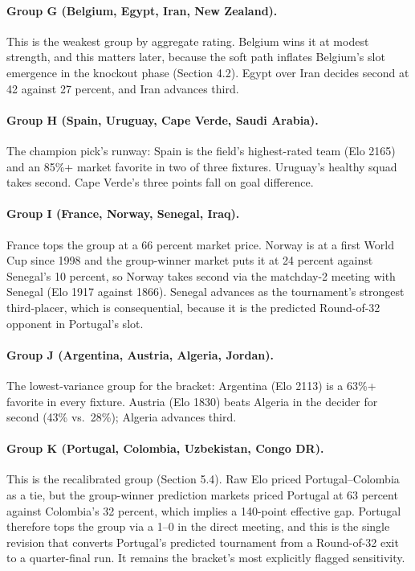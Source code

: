 \documentclass[11pt,a4paper]{article}
\begin{document}
\paragraph{Group G (Belgium, Egypt, Iran, New Zealand).} This is the weakest group by aggregate rating. Belgium wins it at modest strength, and this matters later, because the soft path inflates Belgium's slot emergence in the knockout phase (Section 4.2). Egypt over Iran decides second at 42 against 27 percent, and Iran advances third.

\paragraph{Group H (Spain, Uruguay, Cape Verde, Saudi Arabia).} The champion pick's runway: Spain is the field's highest-rated team (Elo 2165) and an 85\%+ market favorite in two of three fixtures. Uruguay's healthy squad takes second. Cape Verde's three points fall on goal difference.

\paragraph{Group I (France, Norway, Senegal, Iraq).} France tops the group at a 66 percent market price. Norway is at a first World Cup since 1998 and the group-winner market puts it at 24 percent against Senegal's 10 percent, so Norway takes second via the matchday-2 meeting with Senegal (Elo 1917 against 1866). Senegal advances as the tournament's strongest third-placer, which is consequential, because it is the predicted Round-of-32 opponent in Portugal's slot.

\paragraph{Group J (Argentina, Austria, Algeria, Jordan).} The lowest-variance group for the bracket: Argentina (Elo 2113) is a 63\%+ favorite in every fixture. Austria (Elo 1830) beats Algeria in the decider for second (43\% vs.\ 28\%); Algeria advances third.

\paragraph{Group K (Portugal, Colombia, Uzbekistan, Congo DR).} This is the recalibrated group (Section 5.4). Raw Elo priced Portugal--Colombia as a tie, but the group-winner prediction markets priced Portugal at 63 percent against Colombia's 32 percent, which implies a 140-point effective gap. Portugal therefore tops the group via a 1--0 in the direct meeting, and this is the single revision that converts Portugal's predicted tournament from a Round-of-32 exit to a quarter-final run. It remains the bracket's most explicitly flagged sensitivity.
\end{document}
